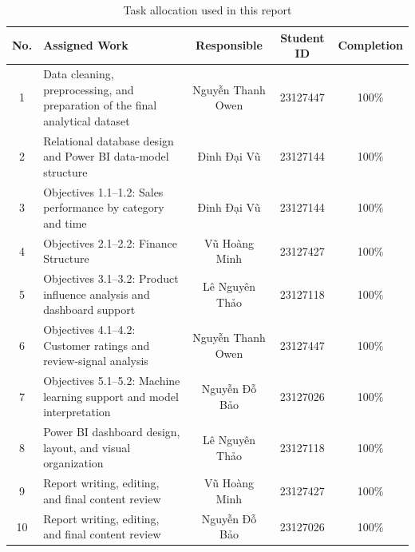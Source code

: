 \begin{table}[H]
\centering
\small
\renewcommand{\arraystretch}{1.3}
\begin{tabularx}{\textwidth}{|c|X|c|c|c|}
\hline
\textbf{No.} & \textbf{Assigned Work} & \textbf{Responsible} & \textbf{Student ID} & \textbf{Completion} \\ \hline
1 & Data cleaning, preprocessing, and preparation of the final analytical dataset & Nguyễn Thanh Owen & 23127447 & 100\% \\ \hline
2 & Relational database design and Power BI data-model structure & Đinh Đại Vũ & 23127144 & 100\% \\ \hline
3 & Objectives 1.1--1.2: Sales performance by category and time & Đinh Đại Vũ & 23127144 & 100\% \\ \hline
4 & Objectives 2.1--2.2: Finance Structure & Vũ Hoàng Minh & 23127427 & 100\% \\ \hline
5 & Objectives 3.1--3.2: Product influence analysis and dashboard support & Lê Nguyên Thảo & 23127118 & 100\% \\ \hline
6 & Objectives 4.1--4.2: Customer ratings and review-signal analysis & Nguyễn Thanh Owen & 23127447 & 100\% \\ \hline
7 & Objectives 5.1--5.2: Machine learning support and model interpretation & Nguyễn Đỗ Bảo & 23127026 & 100\% \\ \hline
8 & Power BI dashboard design, layout, and visual organization & Lê Nguyên Thảo & 23127118 & 100\% \\ \hline
9 & Report writing, editing, and final content review & Vũ Hoàng Minh & 23127427 & 100\% \\ \hline
10 & Report writing, editing, and final content review & Nguyễn Đỗ Bảo & 23127026 & 100\% \\ \hline
\end{tabularx}
\caption{Task allocation used in this report}
\label{tab:task-distribution}
\end{table}
